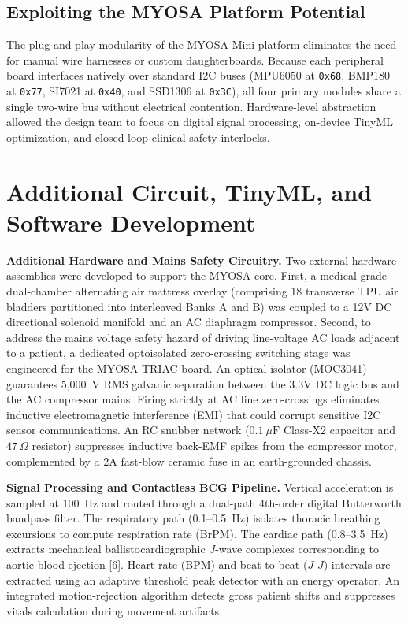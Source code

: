 ﻿\documentclass[11pt,a4paper]{article}
\begin{document}
\subsection{Exploiting the MYOSA Platform Potential}
The plug-and-play modularity of the MYOSA Mini platform eliminates the need for manual wire harnesses or custom daughterboards. Because each peripheral board interfaces natively over standard I2C buses (MPU6050 at \texttt{0x68}, BMP180 at \texttt{0x77}, SI7021 at \texttt{0x40}, and SSD1306 at \texttt{0x3C}), all four primary modules share a single two-wire bus without electrical contention. Hardware-level abstraction allowed the design team to focus on digital signal processing, on-device TinyML optimization, and closed-loop clinical safety interlocks.

\section{Additional Circuit, TinyML, and Software Development}

\noindent \textbf{Additional Hardware and Mains Safety Circuitry.} Two external hardware assemblies were developed to support the MYOSA core. First, a medical-grade dual-chamber alternating air mattress overlay (comprising 18 transverse TPU air bladders partitioned into interleaved Banks A and B) was coupled to a 12V DC directional solenoid manifold and an AC diaphragm compressor. Second, to address the mains voltage safety hazard of driving line-voltage AC loads adjacent to a patient, a dedicated optoisolated zero-crossing switching stage was engineered for the MYOSA TRIAC board. An optical isolator (MOC3041) guarantees 5,000~V RMS galvanic separation between the 3.3V DC logic bus and the AC compressor mains. Firing strictly at AC line zero-crossings eliminates inductive electromagnetic interference (EMI) that could corrupt sensitive I2C sensor communications. An RC snubber network ($0.1~\mu\text{F}$ Class-X2 capacitor and $47~\Omega$ resistor) suppresses inductive back-EMF spikes from the compressor motor, complemented by a 2A fast-blow ceramic fuse in an earth-grounded chassis.

\noindent \textbf{Signal Processing and Contactless BCG Pipeline.} Vertical acceleration is sampled at 100~Hz and routed through a dual-path 4th-order digital Butterworth bandpass filter. The respiratory path (0.1--0.5~Hz) isolates thoracic breathing excursions to compute respiration rate (BrPM). The cardiac path (0.8--3.5~Hz) extracts mechanical ballistocardiographic $J$-wave complexes corresponding to aortic blood ejection [6]. Heart rate (BPM) and beat-to-beat ($J$-$J$) intervals are extracted using an adaptive threshold peak detector with an energy operator. An integrated motion-rejection algorithm detects gross patient shifts and suppresses vitals calculation during movement artifacts.
\end{document}
